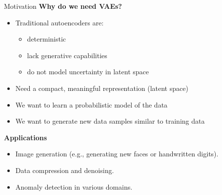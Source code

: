 \begin{frame}[allowframebreaks]{}
    \begin{figure}
        \centering
    \end{figure}
\end{frame}

\begin{frame}[allowframebreaks]{Motivation}
    \textbf{Why do we need VAEs?}
    \begin{itemize}
        \item Traditional autoencoders are:
        \begin{itemize}
            \item deterministic 
            \item lack generative capabilities
            \item do not model uncertainty in latent space
        \end{itemize}
        \item Need a compact, meaningful representation (latent space)
        \item We want to learn a probabilistic model of the data
        \item We want to generate new data samples similar to training data
    \end{itemize}

    \framebreak

    \textbf{Applications}
    \begin{itemize}
        \item Image generation (e.g., generating new faces or handwritten digits).
        \item Data compression and denoising.
        \item Anomaly detection in various domains.
    \end{itemize}
\end{frame}